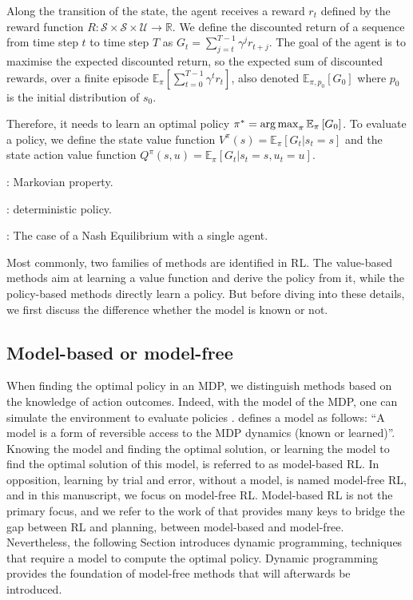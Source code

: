 Along the transition of the state, the agent receives a reward $r_t$ defined by the reward function $R:\mathcal{S} \times \mathcal{S} \times \mathcal{U} \rightarrow \mathbb{R}$.
We define the discounted return of a sequence from time step $t$ to time step $T$ as $G_t= \sum_{j=t}^{T-1} \gamma^j r_{t+j}$.
The goal of the agent is to maximise the expected discounted return, so the expected sum of discounted rewards, over a finite episode $\mathbb{E}_{\pi} \left[\sum_{t=0}^{T-1} \gamma^t r_t \right]$, also denoted $\mathbb{E}_{\pi, p_0}\left[ G_0 \right]$ where $p_0$ is the initial distribution of $s_0$.

Therefore, it needs to learn an optimal policy $\pi^*=\operatorname*{arg\,max}_\pi \mathbb{E}_{\pi}\left[ G_0 \right]$.
To evaluate a policy, we define the state value function $V^\pi(s) = \mathbb{E}_{\pi}\left[G_t|s_t=s\right]$ and the state action value function $Q^\pi(s, u) = \mathbb{E}_{\pi}\left[G_t|s_t=s, u_t=u\right]$.


\todo: Markovian property.

\todo: deterministic policy.

\todo: The case of a Nash Equilibrium with a single agent.

Most commonly, two families of methods are identified in RL.
The value-based methods aim at learning a value function and derive the policy from it, while the policy-based methods directly learn a policy.
But before diving into these details, we first discuss the difference whether the model is known or not.

\subsection{Model-based or model-free}
\label{sec:ch2_model_based_vs_model_free}

When finding the optimal policy in an MDP, we distinguish methods based on the knowledge of action outcomes.
Indeed, with the model of the MDP, one can simulate the environment to evaluate policies \citep{sutton2018reinforcement}.
\cite{moerland2023model} defines a model as follows: ``A model is a form of reversible access to the MDP dynamics (known or learned)''.
Knowing the model and finding the optimal solution, or learning the model to find the optimal solution of this model, is referred to as model-based RL.
In opposition, learning by trial and error, without a model, is named model-free RL, and in this manuscript, we focus on model-free RL.
Model-based RL is not the primary focus, and we refer to the work of \cite{moerland2023model} that provides many keys to bridge the gap between RL and planning, between model-based and model-free.
Nevertheless, the following Section introduces dynamic programming, techniques that require a model to compute the optimal policy.
Dynamic programming provides the foundation of model-free methods that will afterwards be introduced.

